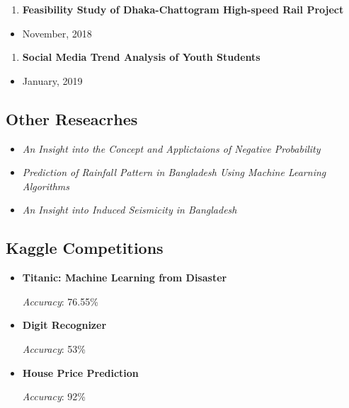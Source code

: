 \documentclass[
]{book}
\providecommand{\tightlist}{%
  \setlength{\itemsep}{0pt}\setlength{\parskip}{0pt}}
\begin{document}
\begin{enumerate}
\def\labelenumi{\arabic{enumi}.}
\tightlist
\item
  \textbf{Feasibility Study of Dhaka-Chattogram High-speed Rail Project}
\end{enumerate}

\begin{itemize}
\tightlist
\item
  November, 2018
\end{itemize}

\begin{enumerate}
\def\labelenumi{\arabic{enumi}.}
\setcounter{enumi}{1}
\tightlist
\item
  \textbf{Social Media Trend Analysis of Youth Students}
\end{enumerate}

\begin{itemize}
\tightlist
\item
  January, 2019
\end{itemize}

\hypertarget{other-reseacrhes}{%
\subsection*{Other Reseacrhes}\label{other-reseacrhes}}

\begin{itemize}
\tightlist
\item
  \emph{An Insight into the Concept and Applictaions of Negative Probability}
\item
  \emph{Prediction of Rainfall Pattern in Bangladesh Using Machine Learning Algorithms}
\item
  \emph{An Insight into Induced Seismicity in Bangladesh}
\end{itemize}

\hypertarget{kaggle-competitions}{%
\subsection*{Kaggle Competitions}\label{kaggle-competitions}}

\begin{itemize}
\item
  \textbf{Titanic: Machine Learning from Disaster}

  \emph{Accuracy}: 76.55\%
\item
  \textbf{Digit Recognizer}

  \emph{Accuracy}: 53\%
\item
  \textbf{House Price Prediction}

  \emph{Accuracy}: 92\%
\end{itemize}
\end{document}
